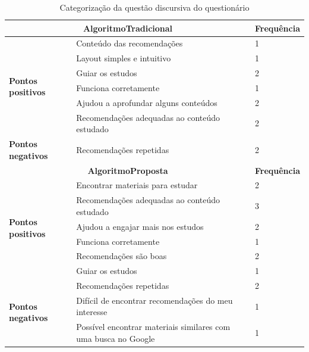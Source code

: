 \begin{table}[h]
\footnotesize
\caption{Categorização da questão discursiva do questionário}
\label{ref:categorizacao-questao-aberta}
\centering
\begin{tabular}{|p{3cm}|p{10cm}|p{2cm}|}
\hline
\multicolumn{2}{|c|}{\textbf{AlgoritmoTradicional}}                                           & \textbf{Frequência} \\
\hline
\multirow{6}{*}{\textbf{Pontos positivos}} & Conteúdo das recomendações                                     & 1          \\
                          & Layout simples e intuitivo                                     & 1          \\
                          & Guiar os estudos                                               & 2          \\
                          & Funciona corretamente                                          & 1          \\
                          & Ajudou a aprofundar alguns conteúdos                           & 2          \\
                          & Recomendações adequadas ao conteúdo estudado                   & 2          \\
\hline
\textbf{Pontos negativos} & Recomendações repetidas                                        & 2          \\
\hline
\multicolumn{2}{|c|}{\textbf{AlgoritmoProposta}}                                              & \textbf{Frequência} \\
\hline
\multirow{6}{*}{\textbf{Pontos positivos}} & Encontrar materiais para estudar                               & 2          \\
                          & Recomendações adequadas ao conteúdo estudado                   & 3          \\
                          & Ajudou a engajar mais nos estudos                              & 2          \\
                          & Funciona corretamente                                          & 1          \\
                          & Recomendações são boas                                         & 2          \\
                          & Guiar os estudos                                               & 1          \\
\hline
\multirow{3}{*}{\textbf{Pontos negativos}} & Recomendações repetidas                                        & 2          \\
                          & Difícil de encontrar recomendações do meu interesse            & 1          \\
                          & Possível encontrar materiais similares com uma busca no Google & 1          \\
\hline
\end{tabular}
\end{table}

